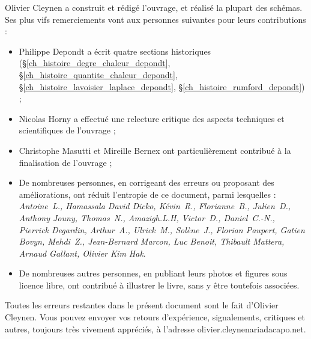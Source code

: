 Olivier Cleynen a construit et rédigé l’ouvrage, et réalisé la plupart des schémas. Ses plus vifs remerciements vont aux personnes suivantes pour leurs contributions :
\begin{itemize}
	\item Philippe Depondt a écrit quatre sections historiques (\S\ref{ch_histoire_degre_chaleur_depondt}, \S\ref{ch_histoire_quantite_chaleur_depondt}, \S\ref{ch_histoire_lavoisier_laplace_depondt}, \S\ref{ch_histoire_rumford_depondt}) ;
	\item Nicolas Horny a effectué une relecture critique des aspects techniques et scientifiques de l’ouvrage ;
	\item Christophe Masutti et Mireille Bernex ont particulièrement contribué à la finalisation de l’ouvrage ;
	\item De nombreuses personnes, en corrigeant des erreurs ou proposant des améliorations, ont réduit l’entropie de ce document, parmi lesquelles : {\small\textit{Antoine\ L., Hamassala David Dicko, Kévin\ R., Florianne\ B., Julien\ D., Anthony Jouny, Thomas\ N., Amazigh.L.H, Victor\ D., Daniel\ C.-N., Pierrick Degardin, Arthur\ A., Ulrick\ M., Solène\ J., Florian Paupert, Gatien Bovyn, Mehdi\ Z., Jean-Bernard Marcon, Luc Benoit, Thibault Mattera, Arnaud Gallant, Olivier Kim Hak}}.
	\item De nombreuses autres personnes, en publiant leurs photos et figures sous licence libre, ont contribué à illustrer le livre, sans y être toutefois associées.
\end{itemize}

Toutes les erreurs restantes dans le présent document sont le fait d’Olivier \mbox{Cleynen}. Vous pouvez envoyer vos retours d’expérience, signalements, critiques et autres, toujours très vivement appréciés, à l’adresse olivier.cleynenariadacapo.net.

